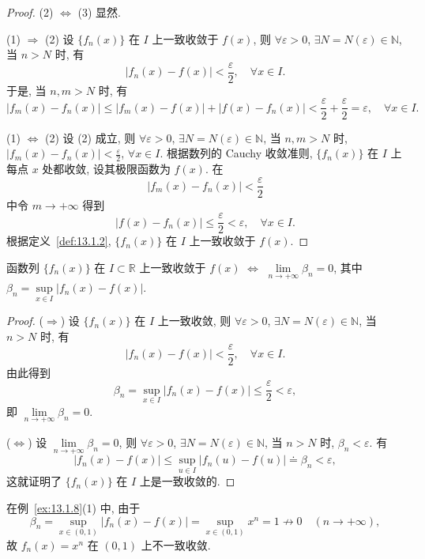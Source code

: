 \begin{proof}
(2) $\Leftrightarrow$ (3) 显然.

(1) $\Rightarrow$ (2) 设 $\{f_{n}(x)\}$ 在 $I$ 上一致收敛于 $f(x)$, 则 $\forall\varepsilon>0$, $\exists N=N(\varepsilon)\in\mathbb{N}$, 当 $n>N$ 时, 有
\[
  |f_{n}(x)-f(x)|<\frac{\varepsilon}{2},\quad\forall x\in I.
\]
于是, 当 $n,m>N$ 时, 有
\[
  |f_{m}(x)-f_{n}(x)|\leqslant|f_{m}(x)-f(x)|+|f(x)-f_{n}(x)|<\frac{\varepsilon}{2}+\frac{\varepsilon}{2}=\varepsilon,\quad\forall x\in I.
\]

(1) $\Leftrightarrow$ (2) 设 (2) 成立, 则 $\forall\varepsilon>0$, $\exists N=N(\varepsilon)\in\mathbb{N}$, 当 $n,m>N$ 时, $|f_{m}(x)-f_{n}(x)|<\frac{\varepsilon}{2}$, $\forall x\in I$. 根据数列的 Cauchy 收敛准则, $\{f_{n}(x)\}$ 在 $I$ 上每点 $x$ 处都收敛, 设其极限函数为 $f(x)$. 在
\[
  |f_{m}(x)-f_{n}(x)|<\frac{\varepsilon}{2}
\]
中令 $m\to+\infty$ 得到
\[
  |f(x)-f_{n}(x)|\leqslant\frac{\varepsilon}{2}<\varepsilon,\quad\forall x\in I.
\]
根据定义~\ref{def:13.1.2}, $\{f_{n}(x)\}$ 在 $I$ 上一致收敛于 $f(x)$.
\end{proof}

\begin{theorem}\label{thm:13.1.2}
函数列 $\{f_{n}(x)\}$ 在 $I\subset\mathbb{R}$ 上一致收敛于 $f(x)$ $\Leftrightarrow$ $\lim\limits_{n\to+\infty}\beta_{n}=0$, 其中 $\beta_{n}=\sup\limits_{x\in I}|f_{n}(x)-f(x)|$.
\end{theorem}

\begin{proof}
($\Rightarrow$) 设 $\{f_{n}(x)\}$ 在 $I$ 上一致收敛, 则 $\forall\varepsilon>0$, $\exists N=N(\varepsilon)\in\mathbb{N}$, 当 $n>N$ 时, 有
\[
  |f_{n}(x)-f(x)|<\frac{\varepsilon}{2},\quad\forall x\in I.
\]
由此得到
\[
  \beta_{n}=\sup_{x\in I}|f_{n}(x)-f(x)|\leqslant\frac{\varepsilon}{2}<\varepsilon,
\]
即 $\lim\limits_{n\to+\infty}\beta_{n}=0$.

($\Leftrightarrow$) 设 $\lim\limits_{n\to+\infty}\beta_{n}=0$, 则 $\forall\varepsilon>0$, $\exists N=N(\varepsilon)\in\mathbb{N}$, 当 $n>N$ 时, $\beta_{n}<\varepsilon$. 有
\[
  |f_{n}(x)-f(x)|\leqslant\sup_{u\in I}|f_{n}(u)-f(u)|\doteq\beta_{n}<\varepsilon,
\]
这就证明了 $\{f_{n}(x)\}$ 在 $I$ 上是一致收敛的.
\end{proof}

\begin{example}\label{ex:13.1.9}
在例~\ref{ex:13.1.8}(1) 中, 由于
\[
  \beta_{n}=\sup_{x\in(0,1)}|f_{n}(x)-f(x)|=\sup_{x\in(0,1)}x^{n}=1\not\to0\quad(n\to+\infty),
\]
故 $f_{n}(x)=x^{n}$ 在 $(0,1)$ 上不一致收敛.
\end{example}

